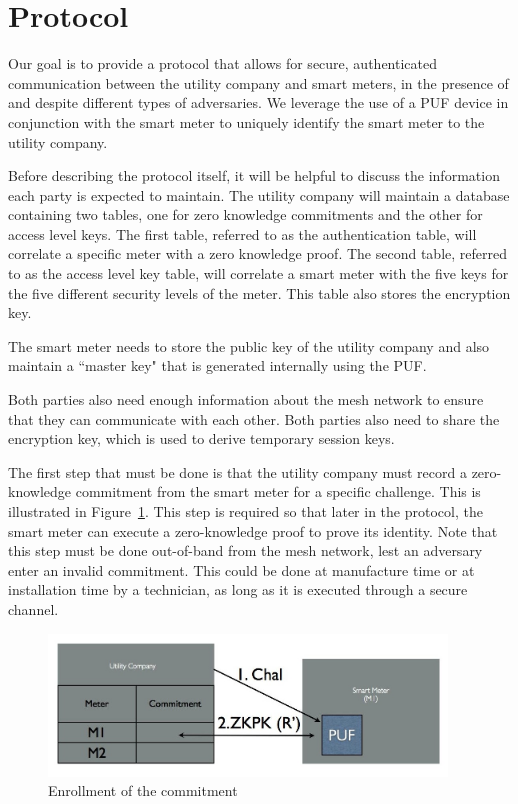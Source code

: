 \section{Protocol}
Our goal is to provide a protocol that allows for secure, authenticated communication between the utility company and
smart meters, in the presence of and despite different types of adversaries.
We leverage the use of a PUF device in conjunction with the smart meter to uniquely identify the smart meter to the
utility company.

Before describing the protocol itself, it will be helpful to discuss the information each party is expected to maintain.
The utility company will maintain a database containing two tables, one for zero knowledge commitments and the 
other for 
access level keys. The first table, referred to as the authentication table, will correlate a specific meter with a zero knowledge proof.
The second table, referred to as the access level key table, will correlate a smart meter with the five keys for the five different security levels of the 
meter. This table also stores the encryption key.

The smart meter needs to store the public key of the utility company and also maintain a ``master key"
that is generated internally using the PUF. 

Both parties also need enough information about
the mesh network to ensure that they can communicate with each other. Both parties also need to share the
encryption key, which is used to derive temporary session keys.

The first step that must be done is that the utility company must record a zero-knowledge commitment from the 
smart meter for a specific challenge. This is illustrated in Figure~\ref{fig:doeconfig}. This step is required so that later
in the protocol, the smart meter can execute a zero-knowledge proof to prove its identity.
Note that this step must be done out-of-band from the mesh network, lest an adversary enter an invalid commitment.
This could be done at manufacture time or at installation time by a technician, as long as it is executed through a secure channel.

\begin{figure}[!ht]
\centering
\includegraphics[width=400px]{images/doe_auth_config.jpg}
\caption{Enrollment of the commitment}
\label{fig:doeconfig}
\vspace{-20pt}
\end{figure}
\FloatBarrier

